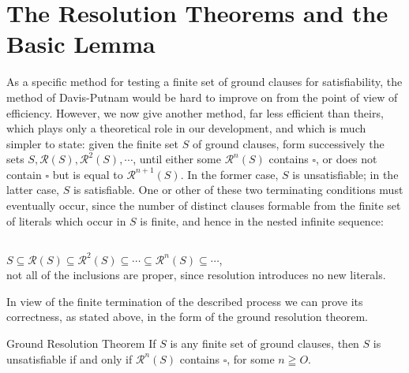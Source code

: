 \documentclass[8pt]{extarticle}
\begin{document}
\section{The Resolution Theorems and the Basic Lemma}

As a specific method for testing a finite set of ground clauses for satisfiability,
the method of Davis-Putnam \cite{davis_1960} would be hard to improve on from the point
of view of efficiency. However, we now give another method, far less efficient
than theirs, which plays only a theoretical role in our development, and which
is much simpler to state: given the finite set $S$ of ground clauses, form successively
the sets $S, \mathcal{R}(S), \mathcal{R}^2(S),\dotsm $, until either some $\mathcal{R}^n(S)$ contains $\square$, or does not
contain $\square$ but is equal to $\mathcal{R}^{n+1}(S)$. In the former case, $S$ is unsatisfiable; in the
latter case, $S$ is satisfiable. One or other of these two terminating conditions
must eventually occur, since the number of distinct clauses formable from the
finite set of literals which occur in $S$ is finite, and hence in the nested infinite
sequence:

\subsection{} $S \subseteq \mathcal{R}(S) \subseteq \mathcal{R}^2(S) \subseteq \dotsm \subseteq \mathcal{R}^n(S) \subseteq \dotsm$, \\ not all of the inclusions are proper, since resolution introduces no new literals.

In view of the finite termination of the described process we can prove its
correctness, as stated above, in the form of the ground resolution theorem. 


\begin{grt}{Ground Resolution Theorem}\label{grt}
If $S$ is any finite set of ground clauses, then $S$ is unsatisfiable if and only if $\mathcal{R}^n(S)$ contains $\square$, for some $n\geqq O$. 
\end{grt}
\end{document}
